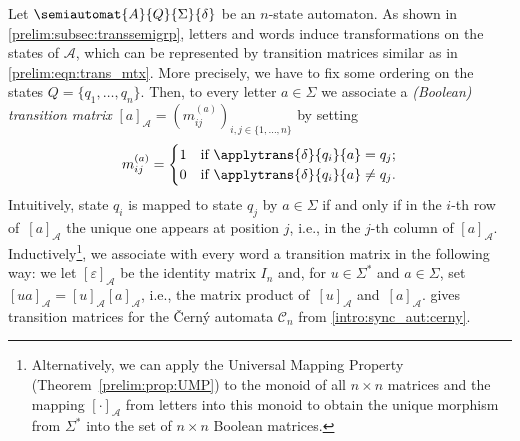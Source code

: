 

\label{def:transitionmtx} 

Let $\semiautomat{A}{Q}{\Sigma}{\delta}$ be an $n$-state automaton.
As shown in \cref{prelim:subsec:transsemigrp}, letters and words induce transformations
on the states of $\mathcal A$, which can be represented
by transition matrices similar as in \cref{prelim:eqn:trans_mtx}.
More precisely, we have to fix some ordering on the states $Q = \{q_1, \ldots, q_n\}$.
Then, to every letter $a \in \Sigma$ we associate a 
\emph{(Boolean) transition matrix}
$[a]_{\mathcal A} = (m^{(a)}_{ij})_{i,j \in \{1,\ldots,n\}}$ by setting
\[
m^{(a)}_{ij} = \begin{cases}
	1 & \text{if } \applytrans{\delta}{q_i}{a} = q_j; \\
	0 & \text{if } \applytrans{\delta}{q_i}{a} \ne q_j.
\end{cases} 
\]
Intuitively, state $q_i$ is mapped to state $q_j$ by $a \in \Sigma$ 
if and only if in the $i$-th row of~$[a]_{\mathcal A}$
the unique one appears at position $j$, i.e., in the $j$-th column of $[a]_{\mathcal A}$.
Inductively\footnote{Alternatively, we can apply the Universal Mapping Property (Theorem~\ref{prelim:prop:UMP})
	to the monoid of all $n \times n$ matrices and the mapping $[\cdot]_{\mathcal A}$ from letters into this monoid
	to obtain the unique morphism from $\Sigma^*$ into the set of $n \times n$ Boolean matrices.}, 
we associate with every word a transition matrix
in the following way: we let $[\varepsilon]_{\mathcal A}$ be the identity matrix $I_n$
and, for $u \in \Sigma^*$ and $a \in \Sigma$, set $[ua]_{\mathcal A} = [u]_{\mathcal A}[a]_{\mathcal A}$, i.e., the matrix product 
of~$[u]_{\mathcal A}$ and~$[a]_{\mathcal A}$.
 gives transition matrices for the \v{C}ern\'y automata $\mathcal C_n$
from \cref{intro:sync_aut:cerny}.

